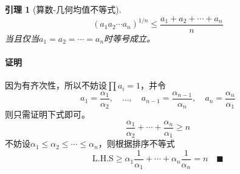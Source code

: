 \documentclass[12pt, a4paper]{article}
\theoremstyle{margin}
\newtheorem{lemma}[thm]{引理}
\newcommand{\lhs}{\text{L.H.S}}
\newcommand{\proof}{\paragraph{证明}}
\begin{document}
  \begin{lemma}[算数-几何均值不等式]
    \[
      (a_1a_2\cdots a_n)^{1/n} \le \frac{a_1+a_2+\cdots+a_n}{n}
    \]
    当且仅当$a_1 = a_2 = \cdots = a_n$时等号成立。
  \end{lemma}
  \proof
    因为有齐次性，所以不妨设$\prod a_i=1$，并令
    \[
      a_1=\frac{\alpha_1}{\alpha_2},\quad
      \dots,\quad
      a_{n-1} = \frac{\alpha_{n-1}}{\alpha_n},\quad
      a_n = \frac{\alpha_n}{\alpha_1}
    \]
    则只需证明下式即可。
    \[
      \frac{\alpha_1}{\alpha_2} + \cdots + \frac{\alpha_n}{\alpha_1}
      \ge n
    \]
    不妨设$\alpha_1 \le \alpha_2 \le \cdots \le \alpha_n$，则根据排序不等式
    \[
      \lhs \ge \alpha_1\frac{1}{\alpha_1} + \cdots + \alpha_n\frac{1}{\alpha_n}
       = n \quad\blacksquare
    \]
\end{document}
